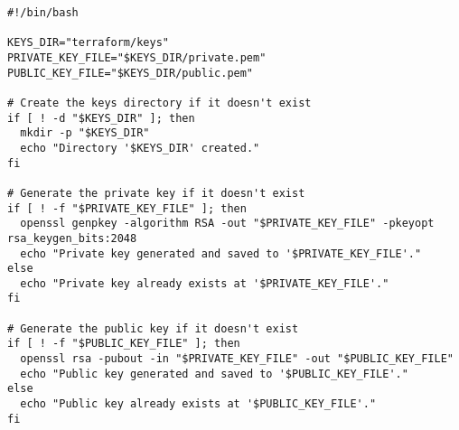 \begin{lstlisting}[style=bashstyle,caption=Create Private Keys,label=apendix:create_private_keys]
#!/bin/bash

KEYS_DIR="terraform/keys"
PRIVATE_KEY_FILE="$KEYS_DIR/private.pem"
PUBLIC_KEY_FILE="$KEYS_DIR/public.pem"

# Create the keys directory if it doesn't exist
if [ ! -d "$KEYS_DIR" ]; then
  mkdir -p "$KEYS_DIR"
  echo "Directory '$KEYS_DIR' created."
fi

# Generate the private key if it doesn't exist
if [ ! -f "$PRIVATE_KEY_FILE" ]; then
  openssl genpkey -algorithm RSA -out "$PRIVATE_KEY_FILE" -pkeyopt rsa_keygen_bits:2048
  echo "Private key generated and saved to '$PRIVATE_KEY_FILE'."
else
  echo "Private key already exists at '$PRIVATE_KEY_FILE'."
fi

# Generate the public key if it doesn't exist
if [ ! -f "$PUBLIC_KEY_FILE" ]; then
  openssl rsa -pubout -in "$PRIVATE_KEY_FILE" -out "$PUBLIC_KEY_FILE"
  echo "Public key generated and saved to '$PUBLIC_KEY_FILE'."
else
  echo "Public key already exists at '$PUBLIC_KEY_FILE'."
fi
\end{lstlisting}